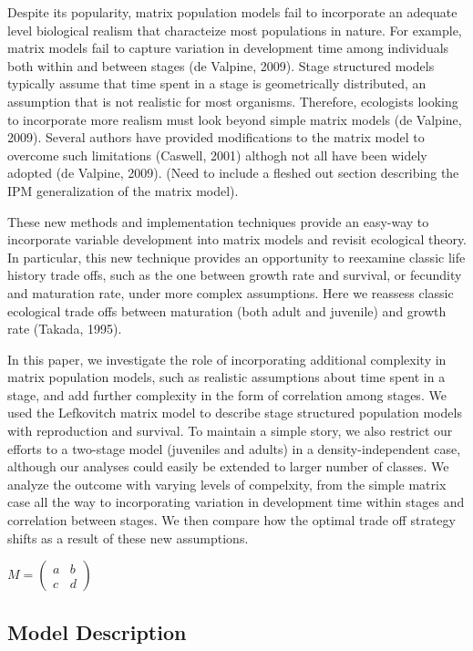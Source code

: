 \documentclass[]{article}
\begin{document}
Despite its popularity, matrix population models fail to incorporate an
adequate level biological realism that characteize most populations in
nature. For example, matrix models fail to capture variation in
development time among individuals both within and between stages (de
Valpine, 2009). Stage structured models typically assume that time spent
in a stage is geometrically distributed, an assumption that is not
realistic for most organisms. Therefore, ecologists looking to
incorporate more realism must look beyond simple matrix models (de
Valpine, 2009). Several authors have provided modifications to the
matrix model to overcome such limitations (Caswell, 2001) althogh not
all have been widely adopted (de Valpine, 2009). (Need to include a
fleshed out section describing the IPM generalization of the matrix
model).

These new methods and implementation techniques provide an easy-way to
incorporate variable development into matrix models and revisit
ecological theory. In particular, this new technique provides an
opportunity to reexamine classic life history trade offs, such as the
one between growth rate and survival, or fecundity and maturation rate,
under more complex assumptions. Here we reassess classic ecological
trade offs between maturation (both adult and juvenile) and growth rate
(Takada, 1995).

In this paper, we investigate the role of incorporating additional
complexity in matrix population models, such as realistic assumptions
about time spent in a stage, and add further complexity in the form of
correlation among stages. We used the Lefkovitch matrix model to
describe stage structured population models with reproduction and
survival. To maintain a simple story, we also restrict our efforts to a
two-stage model (juveniles and adults) in a density-independent case,
although our analyses could easily be extended to larger number of
classes. We analyze the outcome with varying levels of compelxity, from
the simple matrix case all the way to incorporating variation in
development time within stages and correlation between stages. We then
compare how the optimal trade off strategy shifts as a result of these
new assumptions.

$M = \left( \begin{matrix} a&b\\ c&d \end{matrix} \right)$  

\subsection{Model Description}
\end{document}
